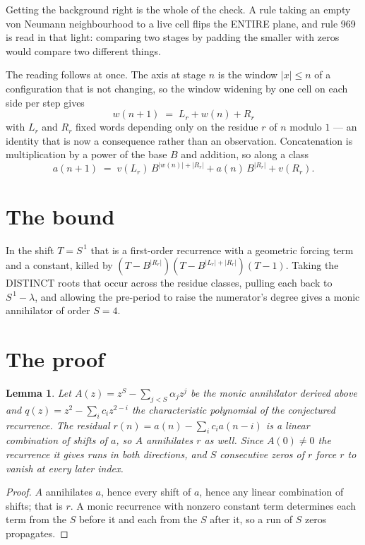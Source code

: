 \documentclass[11pt,a4paper]{article}
\theoremstyle{plain}
\newtheorem{lemma}[theorem]{Lemma}
\theoremstyle{definition}
\begin{document}
Getting the background right is the whole of the check. A rule taking an empty von Neumann
neighbourhood to a live cell flips the ENTIRE plane, and rule 969 is read
in that light: comparing two stages by padding the smaller with zeros would compare two
different things.

The reading follows at once. The axis at stage $n$ is the window $|x|\le n$ of a configuration
that is not changing, so the window widening by one cell on each side per step gives
\[
w(n+1)\;=\;L_r + w(n) + R_r
\]
with $L_r$ and $R_r$ fixed words depending only on the residue $r$ of $n$ modulo $1$ --- an
identity that is now a consequence rather than an observation. Concatenation is multiplication
by a power of the base $B$ and addition, so along a class
\[
a(n+1)\;=\;v(L_r)\,B^{|w(n)|+|R_r|} + a(n)\,B^{|R_r|} + v(R_r).
\]

\section{The bound}

In the shift $T=S^{\,1}$ that is a first-order recurrence with a geometric forcing term and a
constant, killed by $(T-B^{|R_r|})(T-B^{|L_r|+|R_r|})(T-1)$. Taking the DISTINCT roots that
occur across the residue classes, pulling each back to $S^{\,1}-\lambda$, and allowing the
pre-period to raise the numerator's degree gives a monic annihilator of order $S=4$.

\section{The proof}

\begin{lemma}\label{lem:crit}
Let $A(z)=z^S-\sum_{j<S}\alpha_jz^{j}$ be the monic annihilator derived above and
$q(z)=z^{2}-\sum_ic_iz^{2-i}$ the characteristic polynomial of the conjectured
recurrence. The residual $r(n)=a(n)-\sum_ic_ia(n-i)$ is a linear combination of shifts of $a$,
so $A$ annihilates $r$ as well. Since $A(0)\ne0$ the recurrence it gives runs in both
directions, and $S$ consecutive zeros of $r$ force $r$ to vanish at every later index.
\end{lemma}

\begin{proof}
$A$ annihilates $a$, hence every shift of $a$, hence any linear combination of shifts; that is
$r$. A monic recurrence with nonzero constant term determines each term from the $S$ before it
and each from the $S$ after it, so a run of $S$ zeros propagates.
\end{proof}
\end{document}
